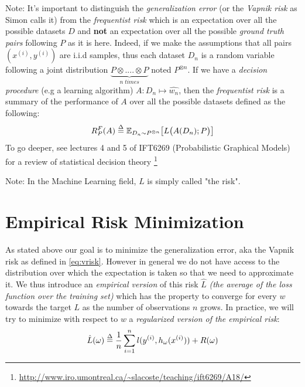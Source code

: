 \begin{paragraph}
{Note:} It's important to distinguish the \textit{generalization error} (or the
\textit{Vapnik risk} as Simon calls it) from the \textit{frequentist risk}
which is an expectation over all the possible datasets $D$ and \textbf{not} an
expectation over all the possible \textit{ground truth pairs} following $P$ as
it is here. Indeed, if we make the assumptions that all pairs $(x^{(i)},
y^{(i)})$ are i.i.d samples, thus each dataset $D_n$ is a random variable
following a joint distribution $\underbrace{P \otimes.... \otimes P}_{n \;
times}$ noted $P^{\otimes n}$. If we have a \textit{decision procedure} (e.g a
learning algorithm) $A: D_n \mapsto \hat{w_n}$, then the \textit{frequentist
risk} is a summary of the performance of $A$ over all the possible datasets
defined as the following:
\begin{equation}
R_P^F(A) \mathrel{\stackrel{\Delta}{=}} \mathbb{E}_{D_n \sim P^{\otimes n}} \big[L\big(A(D_n);P \big)\big]
\end{equation}
To go deeper, see lectures 4 and 5 of IFT6269 (Probabilistic Graphical Models) for a review of statistical decision theory%
\footnote{\url{http://www.iro.umontreal.ca/~slacoste/teaching/ift6269/A18/}}
\end{paragraph}
\begin{paragraph}
{Note:} In the Machine Learning field, $L$ is simply called "the risk".
\end{paragraph}

\section{Empirical Risk Minimization}
As stated above our goal is to minimize the generalization error, aka the
Vapnik risk as defined in \eqref{eq:vrisk}. However in general we do not have
access to the distribution over which the expectation is taken so that we need
to approximate it. We thus introduce an \textit{empirical version} of this risk
$\hat{L}$ \textit{(the average of the loss function over the training set)}
which has the property to converge for every $w$ towards the target $L$ as the
number of observations $n$ grows. In practice, we will try to minimize with
respect to $w$ a \textit{regularized version of the empirical risk}:
\begin{equation}
    \hat L(\omega) \mathrel{\stackrel{\Delta}{=}} \frac{1}{n}\sum_{i=1}^n l(y^{(i)},h_{\omega}(x^{(i)}))
    + R(\omega) \label{eq:erm}
\end{equation} 

